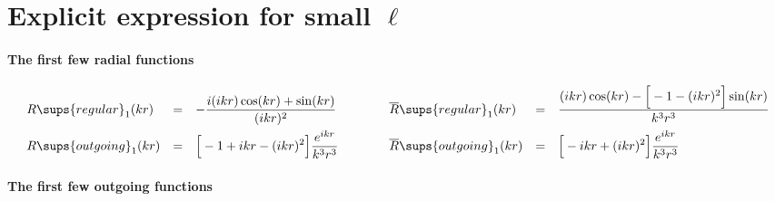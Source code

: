 \documentclass[letterpaper]{article}
\begin{document}
\section{Explicit expression for small $\ell$}

\paragraph{The first few radial functions}

$$\begin{array}{lclclcl}
 R\sups{regular}_1(kr) 
&=&
 \displaystyle{ -\frac{i(ikr)\cos(kr) + \sin (kr)}{(ikr)^2} }
&\qquad&
 \displaystyle{ \overline{R}\sups{regular}_1(kr)  }
&=&
 \displaystyle{ \frac{(ikr)\cos(kr) - \Big[-1-(ikr)^2\Big] \sin(kr)}
                     {k^3 r^3}
              }
\\[10pt]
 R\sups{outgoing}_1(kr) 
&=&
 \displaystyle{ \Big[-1 + ikr - (ikr)^2\Big] \frac{e^{ikr}}{k^3 r^3} }
&\qquad&
 \displaystyle{ \overline{R}\sups{outgoing}_1(kr) }
&=&
 \displaystyle{ \Big[-ikr + (ikr)^2\Big]\frac{e^{ikr}}{k^3r^3} }
\end{array}$$

\paragraph{The first few outgoing functions}
\end{document}
